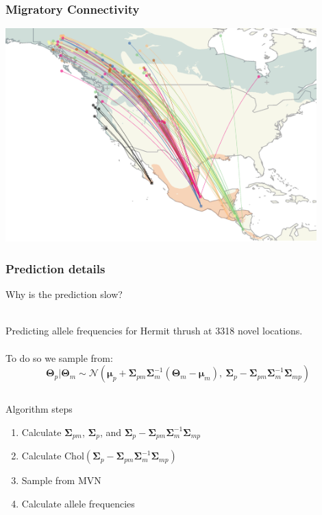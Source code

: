 \documentclass[t]{beamer}\usepackage[]{graphicx}\usepackage[]{color}
\begin{document}
\begin{frame}
\frametitle{Migratory Connectivity}

\vspace{-3mm}

\begin{center}
\includegraphics[width=0.9\textwidth]{figs/wintering.png}
\end{center}

\end{frame}


\begin{frame}
\frametitle{Prediction details}

Why is the prediction slow? \pause 

~\\

Predicting allele frequencies for Hermit thrush at 3318 novel locations.\\

~\\

To do so we sample from:
\[ \bm{\Theta}_p | \bm{\Theta}_m \sim \mathcal{N}(\bm{\mu}_p+\bm\Sigma_{pm}\bm\Sigma_{m}^{-1}(\bm{\Theta}_m-\bm\mu_m),\: \bm\Sigma_{p}-\bm\Sigma_{pm}\bm\Sigma_{m}^{-1}\bm\Sigma_{mp}) \]

\pause

\vspace{-3mm}

\begin{columns}
\begin{block}{Algorithm steps}
\begin{enumerate}
\item Calculate $\bm\Sigma_{pm}$, $\bm\Sigma_{p}$, and $\bm\Sigma_{p}-\bm\Sigma_{pm}\bm\Sigma_{m}^{-1}\bm\Sigma_{mp}$
\item Calculate $\text{Chol}(\bm\Sigma_{p}-\bm\Sigma_{pm}\bm\Sigma_{m}^{-1}\bm\Sigma_{mp})$
\item Sample from MVN
\item Calculate allele frequencies
\end{enumerate}
\end{block}
\end{columns}
\end{frame}
\end{document}
